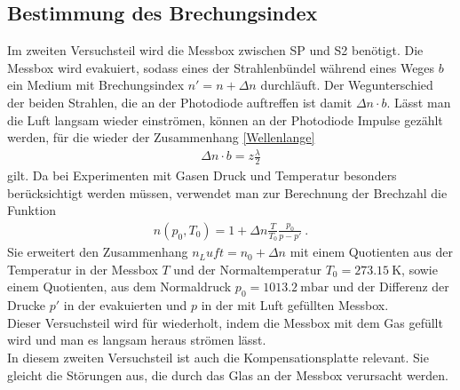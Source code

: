 \subsection*{Bestimmung des Brechungsindex}
Im zweiten Versuchsteil wird die Messbox zwischen SP und S2 benötigt. Die Messbox wird evakuiert, sodass eines der Strahlenbündel während eines Weges $b$ ein Medium mit Brechungsindex $n' = n + \Delta n$ durchläuft. Der Wegunterschied der beiden Strahlen, die an der Photodiode auftreffen ist damit $\Delta n\cdot b$. Lässt man die Luft langsam wieder einströmen, können an der Photodiode Impulse gezählt werden, für die wieder der Zusammenhang \eqref{Wellenlange}
\begin{align}
	\Delta n\cdot b = z \frac{\lambda}{2}
\end{align}
gilt. Da bei Experimenten mit Gasen Druck und Temperatur besonders berücksichtigt werden müssen, verwendet man zur Berechnung der Brechzahl die Funktion
\begin{align}
	n(p_0,T_0) = 1 + \Delta n\frac{T}{T_0}\frac{p_0}{p-p'} \ .
\end{align}
Sie erweitert den Zusammenhang $n_Luft = n_0+\Delta n$ mit einem Quotienten aus der Temperatur in der Messbox $T$ und der Normaltemperatur $T_0=\SI{273.15}{\kelvin}$, sowie einem Quotienten, aus dem Normaldruck $p_0=\SI{1013.2}{\milli\bar}$ und der Differenz der Drucke $p'$ in der evakuierten und $p$ in der mit Luft gefüllten Messbox. \\
Dieser Versuchsteil wird für  wiederholt, indem die Messbox mit dem Gas gefüllt wird und man es langsam heraus strömen lässt. \\
In diesem zweiten Versuchsteil ist auch die Kompensationsplatte relevant. Sie gleicht die Störungen aus, die durch das Glas an der Messbox verursacht werden.